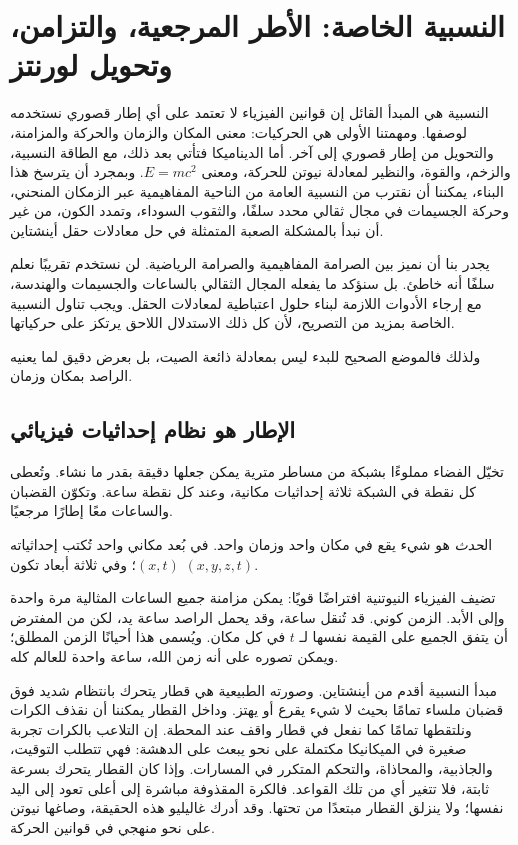 \chapter{النسبية الخاصة: الأطر المرجعية، والتزامن، وتحويل لورنتز}

النسبية هي المبدأ القائل إن قوانين الفيزياء لا تعتمد على أي إطار قصوري نستخدمه لوصفها. ومهمتنا الأولى هي الحركيات: معنى المكان والزمان والحركة والمزامنة، والتحويل من إطار قصوري إلى آخر. أما الديناميكا فتأتي بعد ذلك، مع الطاقة النسبية، والزخم، والقوة، والنظير لمعادلة نيوتن للحركة، ومعنى \(E=mc^2\). وبمجرد أن يترسخ هذا البناء، يمكننا أن نقترب من النسبية العامة من الناحية المفاهيمية عبر الزمكان المنحني، وحركة الجسيمات في مجال ثقالي محدد سلفًا، والثقوب السوداء، وتمدد الكون، من غير أن نبدأ بالمشكلة الصعبة المتمثلة في حل معادلات حقل أينشتاين.

يجدر بنا أن نميز بين الصرامة المفاهيمية والصرامة الرياضية. لن نستخدم تقريبًا نعلم سلفًا أنه خاطئ. بل سنؤكد ما يفعله المجال الثقالي بالساعات والجسيمات والهندسة، مع إرجاء الأدوات اللازمة لبناء حلول اعتباطية لمعادلات الحقل. ويجب تناول النسبية الخاصة بمزيد من التصريح، لأن كل ذلك الاستدلال اللاحق يرتكز على حركياتها.

ولذلك فالموضع الصحيح للبدء ليس بمعادلة ذائعة الصيت، بل بعرض دقيق لما يعنيه الراصد بمكان وزمان.

\section{الإطار هو نظام إحداثيات فيزيائي}

تخيّل الفضاء مملوءًا بشبكة من مساطر مترية يمكن جعلها دقيقة بقدر ما نشاء. وتُعطى كل نقطة في الشبكة ثلاثة إحداثيات مكانية، وعند كل نقطة ساعة. وتكوّن القضبان والساعات معًا إطارًا مرجعيًا.

\begin{definition}
ال\emph{حدث} هو شيء يقع في مكان واحد وزمان واحد. في بُعد مكاني واحد تُكتب إحداثياته \((x,t)\)؛ وفي ثلاثة أبعاد تكون \((x,y,z,t)\).
\end{definition}

تضيف الفيزياء النيوتنية افتراضًا قويًا: يمكن مزامنة جميع الساعات المثالية مرة واحدة وإلى الأبد. الزمن كوني. قد تُنقل ساعة، وقد يحمل الراصد ساعة يد، لكن من المفترض أن يتفق الجميع على القيمة نفسها لـ \(t\) في كل مكان. ويُسمى هذا أحيانًا الزمن المطلق؛ ويمكن تصوره على أنه زمن الله، ساعة واحدة للعالم كله.

مبدأ النسبية أقدم من أينشتاين. وصورته الطبيعية هي قطار يتحرك بانتظام شديد فوق قضبان ملساء تمامًا بحيث لا شيء يقرع أو يهتز. وداخل القطار يمكننا أن نقذف الكرات ونلتقطها تمامًا كما نفعل في قطار واقف عند المحطة. إن التلاعب بالكرات تجربة صغيرة في الميكانيكا مكتملة على نحو يبعث على الدهشة: فهي تتطلب التوقيت، والجاذبية، والمحاذاة، والتحكم المتكرر في المسارات. وإذا كان القطار يتحرك بسرعة ثابتة، فلا تتغير أي من تلك القواعد. فالكرة المقذوفة مباشرة إلى أعلى تعود إلى اليد نفسها؛ ولا ينزلق القطار مبتعدًا من تحتها. وقد أدرك غاليليو هذه الحقيقة، وصاغها نيوتن على نحو منهجي في قوانين الحركة.

